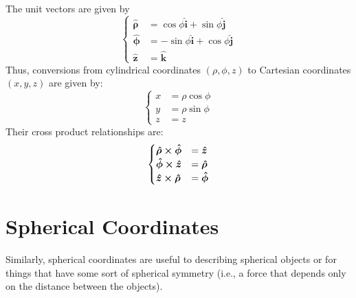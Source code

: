 \documentclass[oneside]{book}
\numberwithin{figure}{section}
\numberwithin{equation}{section}
\newcommand{\bhat}[1]{\bm{\hat{#1}}}
\theoremstyle{definition}
\begin{document}
	The unit vectors are given by
	\begin{equation}
		\begin{cases}
			\bhat{\rho} &= \cos\phi\bhat{i} + \sin\phi\bhat{j}\\
			\bhat{\phi} &= -\sin\phi\bhat{i} + \cos\phi\bhat{j}\\
			\bhat{z} &= \bhat{k}
		\end{cases}
	\end{equation}
	Thus, conversions from cylindrical coordinates $ (\rho, \phi, z) $ to Cartesian coordinates $ (x,y,z) $ are given by:
	\begin{equation}
		\begin{cases}
			x &= \rho\cos\phi\\
			y &= \rho\sin\phi\\
			z &= z
		\end{cases}
	\end{equation}
	Their cross product relationships are:
	\begin{equation}
		\begin{cases}
			\bhat{\rho} \cross \bhat{\phi} &= \bhat{z}\\
			\bhat{\phi} \cross \bhat{z} &= \bhat{\rho}\\
			\bhat{z} \cross \bhat{\rho} &= \bhat{\phi}
		\end{cases}
	\end{equation}

	\section{Spherical Coordinates}
	Similarly, spherical coordinates are useful to describing spherical objects or for things that have some sort of spherical symmetry (i.e., a force that depends only on the distance between the objects).
	
\end{document}
